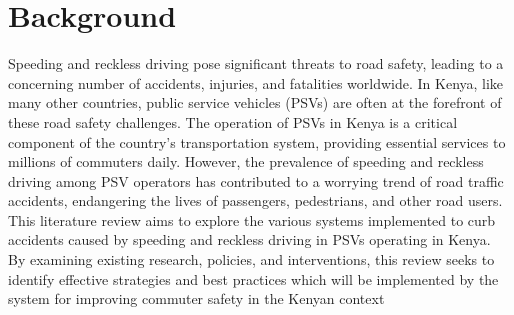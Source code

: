 \documentclass[a4paper, 12pt]{report}
\begin{document}
\section{Background}
\noindent Speeding and reckless driving pose significant threats to road safety, leading to
a concerning number of accidents, injuries, and fatalities worldwide. In Kenya,
like many other countries, public service vehicles (PSVs) are often at the forefront
of these road safety challenges. The operation of PSVs in Kenya is a critical
component of the country's transportation system, providing essential services to
millions of commuters daily. However, the prevalence of speeding and reckless
driving among PSV operators has contributed to a worrying trend of road traffic
accidents, endangering the lives of passengers, pedestrians, and other road users.
This literature review aims to explore the various systems implemented to curb
accidents caused by speeding and reckless driving in PSVs operating in Kenya.
By examining existing research, policies, and interventions, this review seeks to
identify effective strategies and best practices which will be implemented by the
system for improving commuter safety in the Kenyan context
\end{document}
